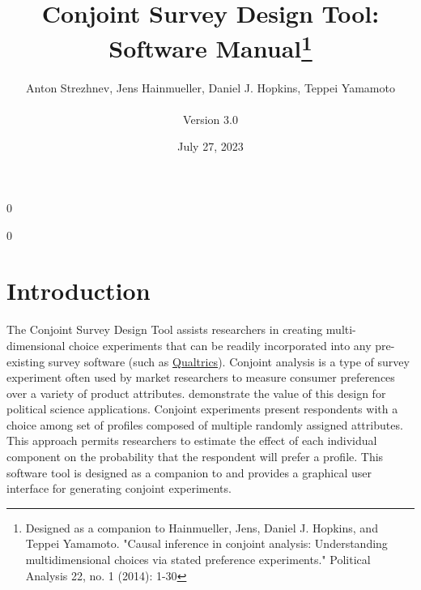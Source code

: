 \documentclass[12pt]{article}
\newcommand\spacingset[1]{\renewcommand{\baselinestretch}{#1}\small\normalsize}
\begin{document}

\newcommand{\blind}{0}

\newcommand{\tit}{Conjoint Survey Design Tool: Software Manual\thanks{Designed as a companion to Hainmueller, Jens, Daniel J. Hopkins, and Teppei Yamamoto. "Causal inference in conjoint analysis: Understanding multidimensional choices via stated preference experiments." Political Analysis 22, no. 1 (2014): 1-30}}

\blind
\title{\bf \tit}
  \author{Anton Strezhnev, Jens Hainmueller, Daniel J. Hopkins, Teppei Yamamoto\\\\Version 3.0}

\date{July 27, 2023}
\maketitle
{}\blind
\maketitle
\fi


\thispagestyle{empty}
\setcounter{page}{0}
\spacingset{1}

\clearpage



\spacingset{1.5}

\tableofcontents
\clearpage
\section{Introduction}

The Conjoint Survey Design Tool assists researchers in creating multi-dimensional choice experiments that can be readily incorporated into any pre-existing survey software (such as \href{http://www.qualtrics.com/}{Qualtrics}). Conjoint analysis is a type of survey experiment often used by market researchers to measure consumer preferences over a variety of product attributes. \cite{hainmueller2013} demonstrate the value of this design for political science applications. Conjoint experiments present respondents with a choice among set of profiles composed of multiple randomly assigned attributes. This approach permits researchers to estimate the effect of each individual component on the probability that the respondent will prefer a profile. This software tool is designed as a companion to \cite{hainmueller2013} and provides a graphical user interface for generating conjoint experiments.
\end{document}
